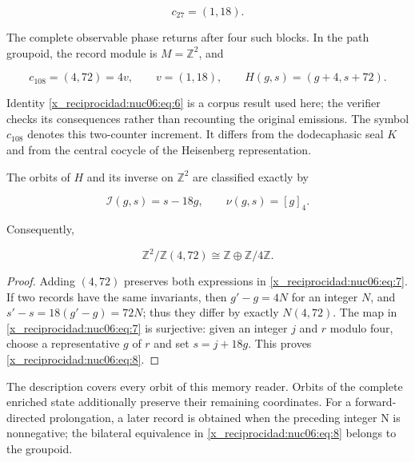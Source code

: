 \[
c_{27}=(1,18).
\]

The complete observable phase returns after four such blocks. In the path groupoid, the record module is \(M=\mathbb Z^2\), and

\begin{equation}
c_{108}=(4,72)=4v,\qquad v=(1,18),\qquad
H(g,s)=(g+4,s+72).
\label{x_reciprocidad:nuc06:eq:6}
\end{equation}

Identity \eqref{x_reciprocidad:nuc06:eq:6} is a corpus result used here; the verifier checks its consequences rather than recounting the original emissions. The symbol \(c_{108}\) denotes this two-counter increment. It differs from the dodecaphasic seal \(K\) and from the central cocycle of the Heisenberg representation.

\begin{theorem}

The orbits of \(H\) and its inverse on \(\mathbb Z^2\) are classified exactly by

\begin{equation}
\boxed{\quad \mathcal I(g,s)=s-18g,\qquad \nu(g,s)=[g]_4.\quad}
\label{x_reciprocidad:nuc06:eq:7}
\end{equation}

Consequently,

\begin{equation}
\mathbb Z^2/\mathbb Z(4,72)\cong\mathbb Z\oplus\mathbb Z/4\mathbb Z.
\label{x_reciprocidad:nuc06:eq:8}
\end{equation}
\end{theorem}

\begin{proof}
Adding \((4,72)\) preserves both expressions in \eqref{x_reciprocidad:nuc06:eq:7}. If two records have the same invariants, then \(g'-g=4N\) for an integer \(N\), and \(s'-s=18(g'-g)=72N\); thus they differ by exactly \(N(4,72)\). The map in \eqref{x_reciprocidad:nuc06:eq:7} is surjective: given an integer \(j\) and \(r\) modulo four, choose a representative \(g\) of \(r\) and set \(s=j+18g\). This proves \eqref{x_reciprocidad:nuc06:eq:8}.
\end{proof}

The description covers every orbit of this memory reader. Orbits of the complete enriched state additionally preserve their remaining coordinates. For a forward-directed prolongation, a later record is obtained when the preceding integer N is nonnegative; the bilateral equivalence in \eqref{x_reciprocidad:nuc06:eq:8} belongs to the groupoid.

